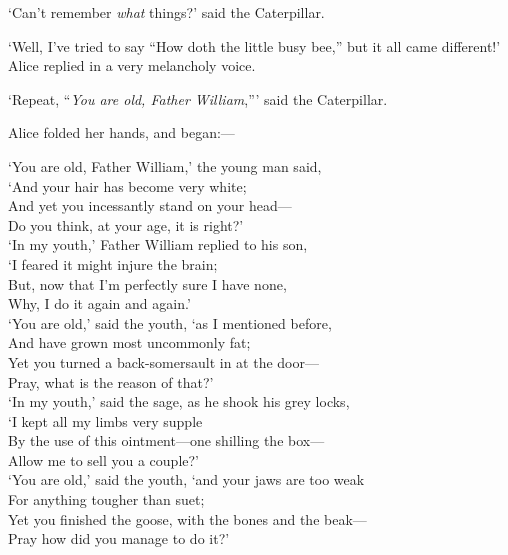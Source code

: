 \documentclass[12pt,openany]{memoir}
\renewenvironment{quote}%
  {\list{}{\leftmargin=2\parindent\rightmargin=0in}\item[]}%
  {\endlist}
\begin{document}
`Can't remember \textit{what} things?' said the Caterpillar.

`Well, I've tried to say ``How doth the little busy bee,'' but it all came different!' Alice replied in a very melancholy voice.

`Repeat, ``\textit{You are old, Father William},''' said the Caterpillar.

Alice folded her hands, and began:---

\begin{quote}
   `You are old, Father William,' the young man said,\\
\hspace*{1em}    `And your hair has become very white;\\
   And yet you incessantly stand on your head---\\
\hspace*{1em}    Do you think, at your age, it is right?'\\

   `In my youth,' Father William replied to his son,\\
\hspace*{1em}    `I feared it might injure the brain;\\
   But, now that I'm perfectly sure I have none,\\
\hspace*{1em}    Why, I do it again and again.'\\

   `You are old,' said the youth, `as I mentioned before,\\
\hspace*{1em}    And have grown most uncommonly fat;\\
   Yet you turned a back-somersault in at the door---\\
\hspace*{1em}    Pray, what is the reason of that?'\\

   `In my youth,' said the sage, as he shook his grey locks,\\
\hspace*{1em}    `I kept all my limbs very supple\\
   By the use of this ointment---one shilling the box---\\
\hspace*{1em}    Allow me to sell you a couple?'\\

   `You are old,' said the youth, `and your jaws are too weak\\
\hspace*{1em}    For anything tougher than suet;\\
   Yet you finished the goose, with the bones and the beak---\\
\hspace*{1em}    Pray how did you manage to do it?'\\


\end{quote}
\end{document}
